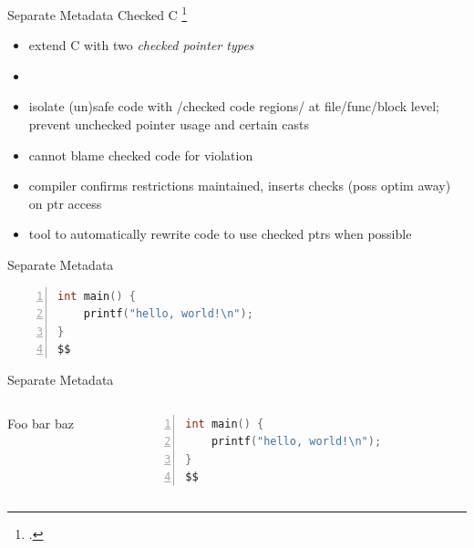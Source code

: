 \documentclass[aspectratio=169]{beamer}
\begin{document}
\begin{frame}{Separate Metadata}
Checked C \footcite{ruef_checked_2017}
    \begin{itemize}
        \item extend C with two \emph{checked pointer types}
        \item {}
        \item isolate (un)safe code with /checked code regions/ at file/func/block level; prevent unchecked pointer usage and certain casts
        \item cannot blame checked code for violation
        \item compiler confirms restrictions maintained, inserts checks (poss optim away) on ptr access
        \item tool to automatically rewrite code to use checked ptrs when possible
    \end{itemize}
\end{frame}

\begin{frame}[fragile]{Separate Metadata}
       \begin{lstlisting}[language=C,numbers=left,mathescape,basicstyle={\footnotesize\ttfamily}]
int main() {
    printf("hello, world!\n");
}
$$
        \end{lstlisting}
\end{frame}

\begin{frame}[fragile]{Separate Metadata}
  \footnotesize
  \begin{columns}[T]
    \begin{column}{0.45\textwidth}
        Foo bar baz
    \end{column}
    \begin{column}{0.45\textwidth}
%      
       \begin{lstlisting}[language=C,numbers=left,mathescape,basicstyle={\footnotesize\ttfamily}]
int main() {
    printf("hello, world!\n");
}
$$
        \end{lstlisting}
    \end{column}
  \end{columns}
\end{frame}
\end{document}
